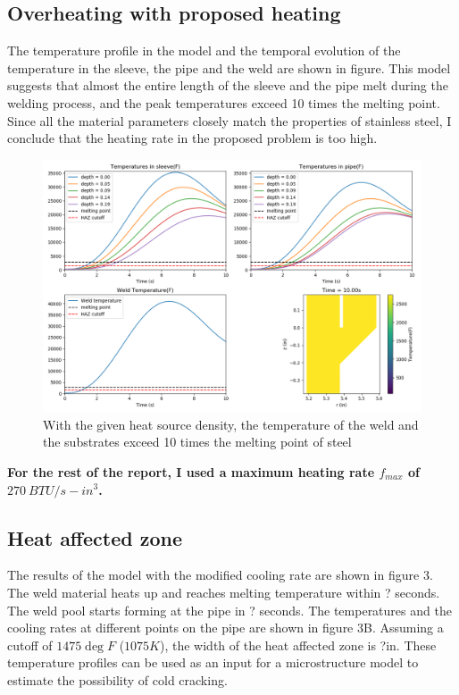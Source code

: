 \documentclass{article}
\makeatletter
\newcommand{\autocitel}[1]{\autocite{#1}\checknextarg}
\newcommand{\checknextarg}{\@ifnextchar\bgroup{\gobblenextarg}{}}
\newcommand{\gobblenextarg}[1]{$^,$\autocite{#1}\@ifnextchar\bgroup{\gobblenextarg}{}}
\makeatother
\begin{document}
\subsection{Overheating with proposed heating}

	The temperature profile in the model and the temporal evolution of the temperature in the sleeve, the pipe and the weld are shown in figure. This model suggests that almost the entire length of the sleeve and the pipe melt during the welding process, and the peak temperatures exceed 10 times the melting point. Since all the material parameters closely match the properties of stainless steel, I conclude that the heating rate in the proposed problem is too high.\\ 

\begin{figure}[h]
\centering
\includegraphics[width=12cm]{old_model.png}
\caption{With the given heat source density, the temperature of the weld and the substrates exceed 10 times the melting point of steel}
\label{fig2}
\end{figure}

\textbf{For the rest of the report, I used a maximum heating rate $f_{max}$ of $270~ BTU/s-in^3$.}


\subsection{Heat affected zone}
	The results of the model with the modified cooling rate are shown in figure 3. The weld material heats up and reaches melting temperature within ? seconds. The weld pool starts forming at the pipe in ? seconds. The temperatures and the cooling rates at different points on the pipe are shown in figure 3B. Assuming a cutoff of $1475 \deg F$ ($1075 K$)\autocitel{cheng2004weld}, the width of the heat affected zone is ?in. These temperature profiles can be used as an input for a microstructure model to estimate the possibility of cold cracking. 
\end{document}
